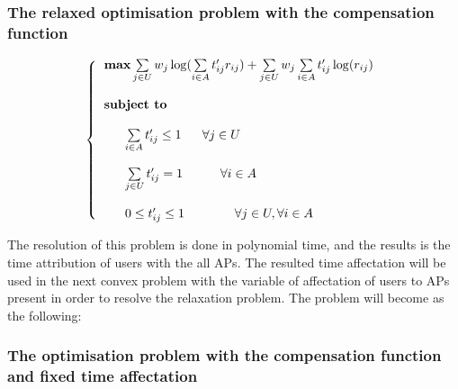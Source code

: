 \documentclass[journal,transmag]{IEEEtran}
\begin{document}
\subsubsection{The relaxed optimisation problem with the compensation function} 
\begin{footnotesize}
\begin{equation}
\left\{
\begin{tabular}{l} 
$\textbf{max}  \sum\limits_{j \in U}  w_j \log (\sum\limits_{i \in A} t'_{ij} r_{ij}) + \sum\limits_{j \in U} w_j \sum\limits_{i \in A} t'_{ij} \log (r_{ij}) $ \\         
\\
\textbf{subject to} \\

\\
~~~~~$ \sum\limits_{i \in A} t'_{ij} \leq 1 $ ~~~ $\forall j \in U $  \\

\\
~~~~~$ \sum\limits_{j \in U} t'_{ij} = 1 ~~~~~~~~~ \forall i \in A $ \\ 

\\
~~~~~$ 0\leq t'_{ij} \leq 1   ~~~~~~~~~~~~ \forall j \in U, \forall i \in A  $ \\

\end{tabular}
\right.
\end{equation}
\end{footnotesize}   
 
The resolution of this problem is done in polynomial time, and the results is the time attribution of users with the all APs. The resulted time affectation will be used in the next convex problem with the variable of affectation of users to APs present in order to resolve the relaxation problem. The problem will become as the following:

\subsubsection{The optimisation problem with the compensation function and fixed time affectation} 
 
\end{document}
